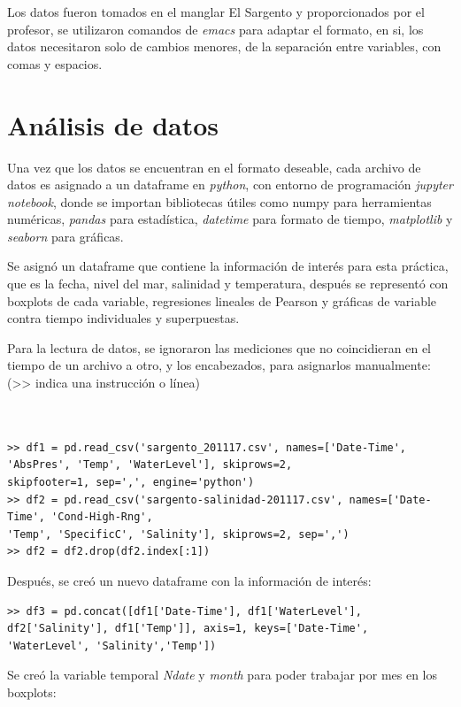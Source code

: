 \documentclass[a4paper]{article}
\begin{document}
Los datos fueron tomados en el manglar El Sargento y proporcionados por el profesor, se utilizaron comandos de \textit{emacs} para adaptar el formato, en si, los datos necesitaron solo de cambios menores, de la separación entre variables, con comas y espacios.

\section{Análisis de datos}

Una vez que los datos se encuentran en el formato deseable,  cada archivo de datos es asignado a un dataframe en \textit{python}, con entorno de programación \textit{jupyter notebook}, donde se importan bibliotecas útiles como numpy \textit{}para herramientas numéricas, \textit{pandas} para estadística, \textit{datetime} para formato de tiempo, \textit{matplotlib} y \textit{seaborn }para gráficas.

Se asignó un dataframe que contiene la información de interés para esta práctica, que es la fecha, nivel del mar, salinidad y temperatura, después se representó con boxplots de cada variable, regresiones lineales de Pearson y gráficas de variable contra tiempo individuales y superpuestas.

Para la lectura de datos, se ignoraron las mediciones que no coincidieran en el tiempo de un archivo a otro, y los encabezados, para asignarlos manualmente: (>> indica una instrucción o línea)

\begin{verbatim}


>> df1 = pd.read_csv('sargento_201117.csv', names=['Date-Time', 'AbsPres', 'Temp', 'WaterLevel'], skiprows=2, 
skipfooter=1, sep=',', engine='python')
>> df2 = pd.read_csv('sargento-salinidad-201117.csv', names=['Date-Time', 'Cond-High-Rng', 
'Temp', 'SpecificC', 'Salinity'], skiprows=2, sep=',')
>> df2 = df2.drop(df2.index[:1])
\end{verbatim}

Después, se creó un nuevo dataframe con la información de interés:

\begin{verbatim}
>> df3 = pd.concat([df1['Date-Time'], df1['WaterLevel'],  df2['Salinity'], df1['Temp']], axis=1, keys=['Date-Time', 'WaterLevel', 'Salinity','Temp'])
\end{verbatim}

Se creó la variable temporal \textit{Ndate} y \textit{month} para poder trabajar por mes en los boxplots:
\end{document}

